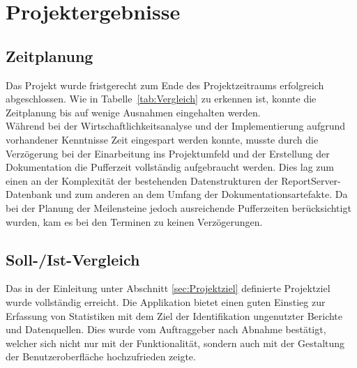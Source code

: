 \section{Projektergebnisse} 
\label{sec:Projektergebnisse}

\subsection{Zeitplanung}
\label{sec:Zeitplanung}
Das Projekt wurde fristgerecht zum Ende des Projektzeitraums erfolgreich abgeschlossen. Wie in Tabelle~\ref{tab:Vergleich} zu erkennen ist, konnte die Zeitplanung bis auf wenige Ausnahmen eingehalten werden.
\\
Während bei der Wirtschaftlichkeitsanalyse und der Implementierung aufgrund vorhandener Kenntnisse Zeit eingespart werden konnte, musste durch die Verzögerung bei der Einarbeitung ins Projektumfeld und der Erstellung der Dokumentation die Pufferzeit vollständig aufgebraucht werden. Dies lag zum einen an der Komplexität der bestehenden Datenstrukturen der ReportServer-Datenbank und zum anderen an dem Umfang der Dokumentationsartefakte. Da bei der Planung der Meilensteine jedoch ausreichende Pufferzeiten berücksichtigt wurden, kam es bei den Terminen zu keinen Verzögerungen.

\subsection{Soll-/Ist-Vergleich}
\label{sec:SollIstVergleich}
Das in der Einleitung unter Abschnitt \ref{sec:Projektziel} definierte Projektziel wurde vollständig erreicht. Die Applikation bietet einen guten Einstieg zur Erfassung von Statistiken mit dem Ziel der Identifikation ungenutzter Berichte und Datenquellen. Dies wurde vom Auftraggeber nach Abnahme bestätigt, welcher sich nicht nur mit der Funktionalität, sondern auch mit der Gestaltung der Benutzeroberfläche hochzufrieden zeigte.

